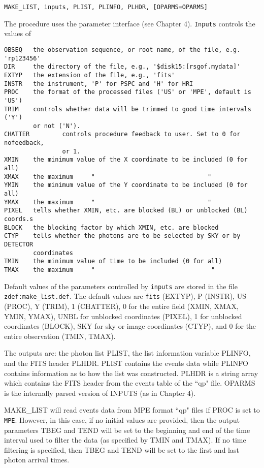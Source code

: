 \medskip\noindent
\begin{verbatim}
MAKE_LIST, inputs, PLIST, PLINFO, PLHDR, [OPARMS=OPARMS]
\end{verbatim}
The procedure uses the parameter interface (see Chapter 4). {\tt Inputs} controls
the values of

\medskip\noindent
\begin{verbatim}
OBSEQ   the observation sequence, or root name, of the file, e.g. 'rp123456'
DIR     the directory of the file, e.g., '$disk15:[rsgof.mydata]'
EXTYP   the extension of the file, e.g., 'fits'
INSTR   the instrument, 'P' for PSPC and 'H' for HRI
PROC    the format of the processed files ('US' or 'MPE', default is 'US')
TRIM    controls whether data will be trimmed to good time intervals ('Y')
        or not ('N').
CHATTER         controls procedure feedback to user. Set to 0 for nofeedback,
                or 1.
XMIN    the minimum value of the X coordinate to be included (0 for all)
XMAX    the maximum     "                               "
YMIN    the minimum value of the Y coordinate to be included (0 for all)
YMAX    the maximum     "                               "
PIXEL   tells whether XMIN, etc. are blocked (BL) or unblocked (BL) coords.s
BLOCK   the blocking factor by which XMIN, etc. are blocked
CTYP    tells whether the photons are to be selected by SKY or by DETECTOR
        coordinates
TMIN    the minimum value of time to be included (0 for all)
TMAX    the maximum     "                                "
\end{verbatim}
Default values of the parameters controlled by {\tt inputs} are stored in the
file {\tt zdef:make{\_}list.def}. The default values are {\tt fits} (EXTYP), P
(INSTR), US (PROC), Y (TRIM), 1 (CHATTER), 0 for the entire field
(XMIN, XMAX, YMIN, YMAX), UNBL for unblocked coordinates (PIXEL), 1 for
unblocked coordinates (BLOCK), SKY for sky or image coordinates (CTYP), and
0 for the entire observation (TMIN, TMAX).
 
The outputs are: the photon list PLIST, the list information variable
PLINFO, and the FITS header PLHDR. PLIST contains the events data while
PLINFO contains information as to how the list was constructed. PLHDR is a
string array which contains the FITS header from the events table of the
``qp" file. OPARMS is the internally parsed version of INPUTS (as in Chapter
4).
 
MAKE{\_}LIST will read events data from MPE format ``qp" files if PROC is set to
{\tt MPE}. However, in this case, if no initial values are provided, then the
output parameters TBEG and TEND will be set to the beginning and end of the
time interval used to filter the data (as specified by TMIN and TMAX). If no
time filtering is specified, then TBEG and TEND will be set  to the first and
last photon arrival times.
 
